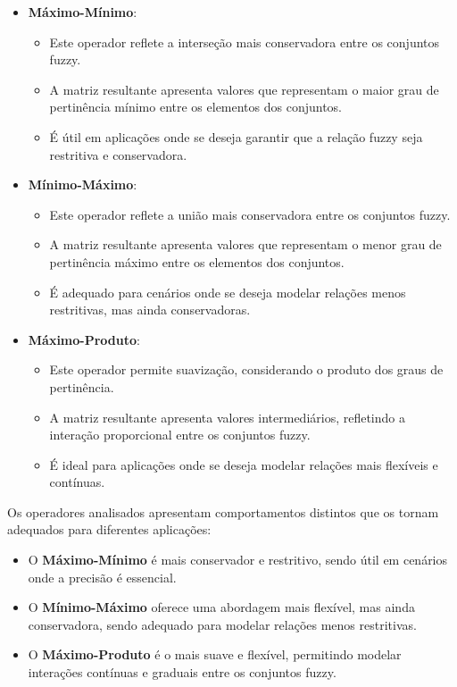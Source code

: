 \documentclass[a4paper,12pt]{article}
\begin{document}
\begin{itemize}
    \item \textbf{Máximo-Mínimo}:
    \begin{itemize}
        \item Este operador reflete a interseção mais conservadora entre os conjuntos fuzzy.
        \item A matriz resultante apresenta valores que representam o maior grau de pertinência mínimo entre os elementos dos conjuntos.
        \item É útil em aplicações onde se deseja garantir que a relação fuzzy seja restritiva e conservadora.
    \end{itemize}

    \item \textbf{Mínimo-Máximo}:
    \begin{itemize}
        \item Este operador reflete a união mais conservadora entre os conjuntos fuzzy.
        \item A matriz resultante apresenta valores que representam o menor grau de pertinência máximo entre os elementos dos conjuntos.
        \item É adequado para cenários onde se deseja modelar relações menos restritivas, mas ainda conservadoras.
    \end{itemize}

\item \textbf{Máximo-Produto}:
    \begin{itemize}
        \item Este operador permite suavização, considerando o produto dos graus de pertinência.
        \item A matriz resultante apresenta valores intermediários, refletindo a interação proporcional entre os conjuntos fuzzy.
        \item É ideal para aplicações onde se deseja modelar relações mais flexíveis e contínuas.
    \end{itemize}
\end{itemize}

Os operadores analisados apresentam comportamentos distintos que os tornam adequados para diferentes aplicações:

\begin{itemize}
    \item O \textbf{Máximo-Mínimo} é mais conservador e restritivo, sendo útil em cenários onde a precisão é essencial.
    \item O \textbf{Mínimo-Máximo} oferece uma abordagem mais flexível, mas ainda conservadora, sendo adequado para modelar relações menos restritivas.
    \item O \textbf{Máximo-Produto} é o mais suave e flexível, permitindo modelar interações contínuas e graduais entre os conjuntos fuzzy.
\end{itemize}
\end{document}
